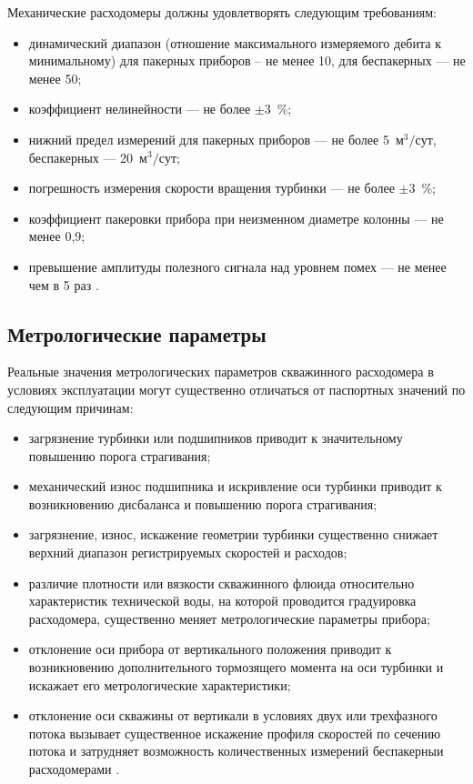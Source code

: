Механические расходомеры должны удовлетворять следующим требованиям:
\begin{itemize}
    \item динамический диапазон (отношение максимального измеряемого дебита к минимальному) для пакерных приборов -- не менее 10, для беспакерных --- не менее 50;
    \item коэффициент нелинейности --- не более $\mathrm{\pm}$3~\%;
    \item нижний предел измерений для пакерных приборов --- не более 5~$\mathrm{м^3 / сут}$, беспакерных --- 20~$\mathrm{м^3 / сут}$;
    \item погрешность измерения скорости вращения турбинки --- не более $\mathrm{\pm}$3~\%;
    \item коэффициент пакеровки прибора при неизменном диаметре колонны --- не менее 0,9;
    \item превышение амплитуды полезного сигнала над уровнем помех --- не менее чем в 5 раз \cite{mechraskhod}.
\end{itemize}

\subsection{Метрологические параметры}

Реальные значения метрологических параметров скважинного
расходомера в условиях эксплуатации могут существенно отличаться
от паспортных значений по следующим причинам:
\begin{itemize}
    \item загрязнение турбинки или подшипников приводит к
          значительному повышению порога страгивания;

    \item механический износ подшипника и искривление оси турбинки
          приводит к возникновению дисбаланса и повышению порога страгивания;
    \item загрязнение, износ, искажение геометрии турбинки существенно
          снижает верхний диапазон регистрируемых скоростей и расходов;

    \item различие плотности или вязкости скважинного флюида
          относительно характеристик технической воды, на которой
          проводится градуировка расходомера, существенно меняет
          метрологические параметры прибора;

    \item отклонение оси прибора от вертикального положения приводит к
          возникновению дополнительного тормозящего момента на оси
          турбинки и искажает его метрологические характеристики;

    \item отклонение оси скважины от вертикали в условиях двух или
          трехфазного потока вызывает существенное искажение профиля
          скоростей по сечению потока и затрудняет возможность
          количественных измерений беспакерныи расходомерами \cite{thermodyn}.
\end{itemize}


